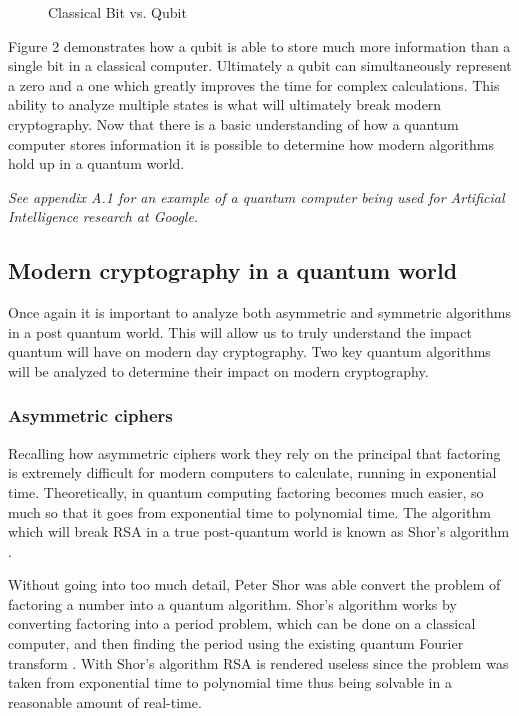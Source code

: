 \documentclass[fleqn, 12pt]{article}
\begin{document}
\begin{figure}[h]
    \begin{center}
        \caption{Classical Bit vs. Qubit \cite{qubit}}
        \label{fig:qubit}
    \end{center}
\end{figure}

Figure 2 demonstrates how a qubit is able to store much more information than a single bit in a classical computer. Ultimately a qubit can simultaneously represent a zero and a one which greatly improves the time for complex calculations. This ability to analyze multiple states is what will ultimately break modern cryptography. Now that there is a basic understanding of how a quantum computer stores information it is possible to determine how modern algorithms hold up in a quantum world.

\textit{See appendix A.1 for an example of a quantum computer being used for Artificial Intelligence research at Google.}

\subsection{Modern cryptography in a quantum world}

Once again it is important to analyze both asymmetric and symmetric algorithms in a post quantum world. This will allow us to truly understand the impact quantum will have on modern day cryptography. Two key quantum algorithms will be analyzed to determine their impact on modern cryptography.

\subsubsection{Asymmetric ciphers}

Recalling how asymmetric ciphers work they rely on the principal that factoring is extremely difficult for modern computers to calculate, running in exponential time. Theoretically, in quantum computing factoring becomes much easier, so much so that it goes from exponential time to polynomial time. The algorithm which will break RSA in a true post-quantum world is known as Shor's algorithm \cite{shor}.

Without going into too much detail, Peter Shor was able convert the problem of factoring a number into a quantum algorithm. Shor's algorithm works by converting factoring into a period problem, which can be done on a classical computer, and then finding the period using the existing quantum Fourier transform \cite{shor}. With Shor's algorithm RSA is rendered useless since the problem was taken from exponential time to polynomial time thus being solvable in a reasonable amount of real-time.
\end{document}
